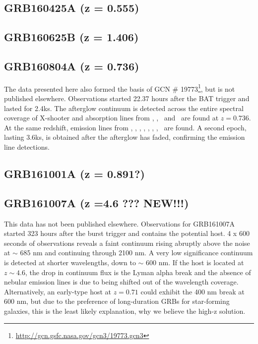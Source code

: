 \documentclass{aa}    %
\begin{document}
\subsection{GRB160425A (z = 0.555)}	



\subsection{GRB160625B (z = 1.406)}	



\subsection{GRB160804A (z = 0.736)}
The data presented here also formed the basis of GCN \#
19773\footnote{\url{http://gcn.gsfc.nasa.gov/gcn3/19773.gcn3}}, but is not
published elsewhere. Observations started 22.37 hours after the BAT trigger and
lasted for 2.4ks. The afterglow continuum is detected across the entire
spectral coverage of X-shooter and absorption lines from \mgi, \mgii, \feii~and
\alii~are found at $z = 0.736$. At the same redshift, emission lines from \oii,
\oiii, \ha, \hb, \hg, \nii, \sii, \siii~are found. A second epoch, lasting
3.6ks, is obtained after the afterglow has faded, confirming the emission line
detections.


\subsection{GRB161001A (z = 0.891?)}	



\subsection{GRB161007A (z =4.6 ??? NEW!!!)}
This data has not been published elsewhere. Observations for GRB161007A started
323 hours after the burst trigger and contains the potential host. 4 x 600 seconds
of observations reveals a faint continuum rising abruptly above the noise at
$\sim$ 685 nm and continuing through 2100 nm. A very low significance
continuum is detected at shorter wavelengths, down to $\sim$ 600 nm. If the
host is located at $z \sim 4.6$, the drop in continuum flux is the Lyman alpha
break and the absence of nebular emission lines is due to \oii being shifted
out of the wavelength coverage. Alternatively, an early-type host at $z = 0.71$
could exhibit the 400 nm break at 600 nm, but due to the preference of
long-duration GRBs for star-forming galaxies, this is the least likely
explanation, why we believe the high-z solution.
\end{document}
